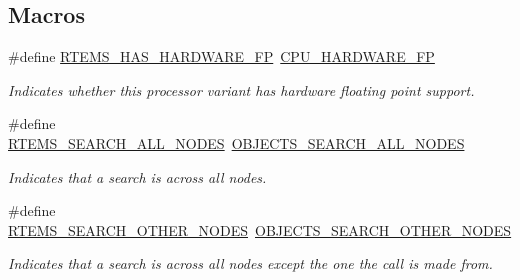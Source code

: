 \subsection*{Macros}
\begin{DoxyCompactItemize}
\item 
\mbox{\label{group__RTEMSAPIClassic_ga20fa239d82b596f8cc6846ea7e882f72}} 
\#define \mbox{\hyperlink{group__RTEMSAPIClassic_ga20fa239d82b596f8cc6846ea7e882f72}{R\+T\+E\+M\+S\+\_\+\+H\+A\+S\+\_\+\+H\+A\+R\+D\+W\+A\+R\+E\+\_\+\+FP}}~\mbox{\hyperlink{sparc_2include_2rtems_2score_2cpu_8h_a112f88f13afe8bb8f1b13f1ca7e09b8d}{C\+P\+U\+\_\+\+H\+A\+R\+D\+W\+A\+R\+E\+\_\+\+FP}}
\begin{DoxyCompactList}\small\item\em Indicates whether this processor variant has hardware floating point support. \end{DoxyCompactList}\item 
\mbox{\label{group__RTEMSAPIClassic_gaad18bdc27dc945519fe89ebfc8c60d27}} 
\#define \mbox{\hyperlink{group__RTEMSAPIClassic_gaad18bdc27dc945519fe89ebfc8c60d27}{R\+T\+E\+M\+S\+\_\+\+S\+E\+A\+R\+C\+H\+\_\+\+A\+L\+L\+\_\+\+N\+O\+D\+ES}}~\mbox{\hyperlink{group__RTEMSScoreObject_ga248222b061dcc3e79288f92b86f4e297}{O\+B\+J\+E\+C\+T\+S\+\_\+\+S\+E\+A\+R\+C\+H\+\_\+\+A\+L\+L\+\_\+\+N\+O\+D\+ES}}
\begin{DoxyCompactList}\small\item\em Indicates that a search is across all nodes. \end{DoxyCompactList}\item 
\mbox{\label{group__RTEMSAPIClassic_ga4e10466925b105d0912977813ad38e0c}} 
\#define \mbox{\hyperlink{group__RTEMSAPIClassic_ga4e10466925b105d0912977813ad38e0c}{R\+T\+E\+M\+S\+\_\+\+S\+E\+A\+R\+C\+H\+\_\+\+O\+T\+H\+E\+R\+\_\+\+N\+O\+D\+ES}}~\mbox{\hyperlink{group__RTEMSScoreObject_ga0d793311d22c1b066f3909005e49ac31}{O\+B\+J\+E\+C\+T\+S\+\_\+\+S\+E\+A\+R\+C\+H\+\_\+\+O\+T\+H\+E\+R\+\_\+\+N\+O\+D\+ES}}
\begin{DoxyCompactList}\small\item\em Indicates that a search is across all nodes except the one the call is made from. \end{DoxyCompactList}\item 
\mbox{\label{group__RTEMSAPIClassic_gaedd0075c1a39a3deef1a1c224d6b8e17}} 

\end{DoxyCompactItemize}
